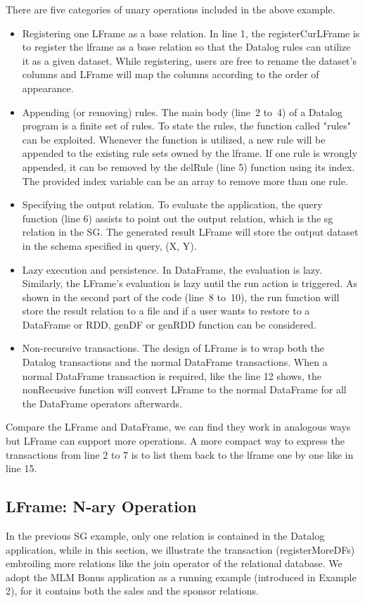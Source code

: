 There are five categories of unary operations included in the above example. 
\begin{itemize}
	\item Registering one LFrame as a base relation. In line 1, the registerCurLFrame is to register the lframe as a base relation so that the Datalog rules can utilize it as a given dataset. While registering, users are free to rename the dataset's columns and  LFrame will map the columns according to the order of appearance. 
	\item Appending (or removing) rules. The main body (line~2 to~4) of a Datalog program is a finite set of rules. To state the rules, the function called "rules" can be exploited. Whenever the function is utilized,  a new rule will be appended to the existing rule sets owned by the lframe.
	If one rule is wrongly appended, it can be removed by the delRule (line 5) function using its index. The provided index variable can be an array  to remove more than one rule.
	\item Specifying the output relation. To evaluate the application, the query function (line 6)  assists to point out the output relation, which is the sg relation in the SG. The generated result LFrame will store the output dataset in the schema specified in query, (X, Y).  
	\item Lazy execution and persistence. In DataFrame, the evaluation is lazy. Similarly, the LFrame's evaluation is lazy until the run action is triggered.  As shown in the second part of the code (line~8 to~10), the run function will store the result relation to a file and if a user wants to restore to a DataFrame or RDD,  genDF or genRDD function can be considered. 
	\item Non-recursive transactions. The design of LFrame is to wrap both the Datalog transactions and the normal DataFrame transactions. When a normal DataFrame transaction is required, like the line 12 shows, the nonRecusive function will convert LFrame to the normal DataFrame for all the DataFrame operators afterwards. 
\end{itemize}
Compare the LFrame and DataFrame, we can find they work in  analogous ways  but LFrame can support more operations. A more compact way to express the transactions from line 2 to 7 is to list them back to the lframe one by one like in line 15. 
\subsection{LFrame: N-ary Operation}
\label{sec:nary}
In the previous SG example, only one relation is contained in the Datalog application, while in this section, we illustrate the transaction (registerMoreDFs)  embroiling more relations like the join operator of the relational database. We adopt the MLM Bonus application as a running example (introduced in Example 2), for it contains both the sales and the sponsor relations. 

